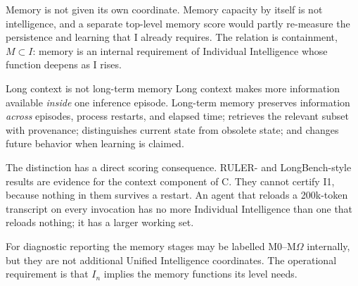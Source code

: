 \documentclass[11pt]{article}
\theoremstyle{definition}
\newcommand{\Om}{\ensuremath{\Omega}}
\begin{document}
Memory is not given its own coordinate. Memory capacity by itself is not intelligence, and a separate top-level memory score would partly re-measure the persistence and learning that I already requires. The relation is containment, $M \subset I$: memory is an internal requirement of Individual Intelligence whose function deepens as I rises.

\begin{claimbox}{Long context is not long-term memory}
Long context makes more information available \emph{inside} one inference episode. Long-term memory preserves information \emph{across} episodes, process restarts, and elapsed time; retrieves the relevant subset with provenance; distinguishes current state from obsolete state; and changes future behavior when learning is claimed.

The distinction has a direct scoring consequence. RULER- and LongBench-style results are evidence for the context component of C. They cannot certify I1, because nothing in them survives a restart. An agent that reloads a 200k-token transcript on every invocation has no more Individual Intelligence than one that reloads nothing; it has a larger working set.
\end{claimbox}

For diagnostic reporting the memory stages may be labelled M0--M\Om{} internally, but they are not additional Unified Intelligence coordinates. The operational requirement is that $I_n$ implies the memory functions its level needs.
\end{document}
